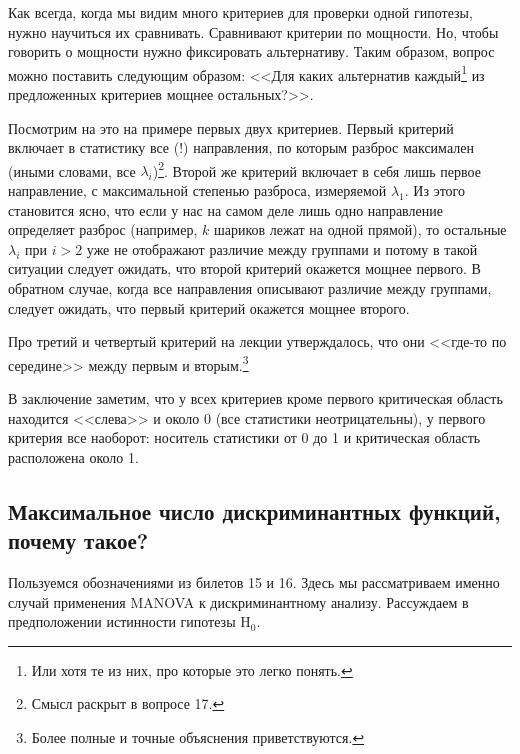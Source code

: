 Как всегда, когда мы видим много критериев для проверки одной гипотезы, нужно научиться их сравнивать.
Сравнивают критерии по мощности. Но, чтобы говорить о мощности нужно фиксировать альтернативу.
Таким образом, вопрос можно поставить следующим образом: <<Для каких альтернатив каждый\footnote{Или хотя те из них, про которые это легко понять.}
из предложенных критериев мощнее остальных?>>.

Посмотрим на это на примере первых двух критериев.
Первый критерий включает в статистику все (!) направления, по которым разброс максимален (иными словами, все $\lambda_i$)\footnote{Смысл раскрыт в вопросе 17.}.
Второй же критерий включает в себя лишь первое направление, с максимальной степенью разброса, измеряемой $\lambda_1$.
Из этого становится ясно, что если у нас на самом деле лишь одно направление определяет разброс (например, $k$ шариков лежат на одной прямой),
то остальные $\lambda_i$ при $i > 2$ уже не отображают различие между группами и потому в такой ситуации следует ожидать, что второй критерий окажется мощнее первого.
В обратном случае, когда все направления описывают различие между группами, следует ожидать, что первый критерий окажется мощнее второго.

Про третий и четвертый критерий на лекции утверждалось, что они <<где-то по середине>> между первым и вторым.\footnote{{\color{blue} Более полные и точные объяснения приветствуются.}}

В заключение заметим, что у всех критериев кроме первого критическая область находится <<слева>> и около 0 (все статистики неотрицательны),
у первого критерия все наоборот: носитель статистики от 0 до 1 и критическая область расположена около 1.

\subsection{Максимальное число дискриминантных функций, почему такое?}

Пользуемся обозначениями из билетов 15 и 16. Здесь мы рассматриваем именно случай применения MANOVA к дискриминантному анализу.
Рассуждаем в предположении истинности гипотезы $\mathrm H_0$.


